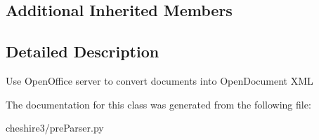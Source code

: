 \subsection*{Additional Inherited Members}


\subsection{Detailed Description}
\begin{DoxyVerb}Use OpenOffice server to convert documents into OpenDocument XML \end{DoxyVerb}
 

The documentation for this class was generated from the following file\-:\begin{DoxyCompactItemize}
\item 
cheshire3/pre\-Parser.\-py\end{DoxyCompactItemize}
